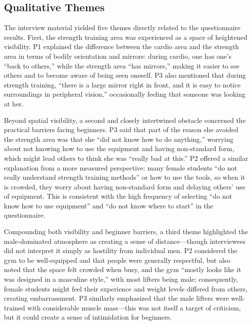 \subsection{Qualitative Themes}

The interview material yielded five themes directly related to the questionnaire results.
First, the strength training area was experienced as a space of heightened visibility.
P1 explained the difference between the cardio area and the strength area in terms of bodily orientation and mirrors: during cardio, one has one's ``back to others,'' while the strength area ``has mirrors,'' making it easier to see others and to become aware of being seen oneself.
P3 also mentioned that during strength training, ``there is a large mirror right in front, and it is easy to notice surroundings in peripheral vision,'' occasionally feeling that someone was looking at her.

Beyond spatial visibility, a second and closely intertwined obstacle concerned the practical barriers facing beginners.
P3 said that part of the reason she avoided the strength area was that she ``did not know how to do anything,'' worrying about not knowing how to use the equipment and having non-standard form, which might lead others to think she was ``really bad at this.''
P2 offered a similar explanation from a more measured perspective: many female students ``do not really understand strength training methods'' or how to use the tools, so when it is crowded, they worry about having non-standard form and delaying others' use of equipment.
This is consistent with the high frequency of selecting ``do not know how to use equipment'' and ``do not know where to start'' in the questionnaire.

Compounding both visibility and beginner barriers, a third theme highlighted the male-dominated atmosphere as creating a sense of distance---though interviewees did not interpret it simply as hostility from individual men.
P2 considered the gym to be well-equipped and that people were generally respectful, but also noted that the space felt crowded when busy, and the gym ``mostly looks like it was designed in a masculine style,'' with most lifters being male; consequently, female students might feel their experience and weight levels differed from others, creating embarrassment.
P3 similarly emphasized that the male lifters were well-trained with considerable muscle mass---this was not itself a target of criticism, but it could create a sense of intimidation for beginners.

